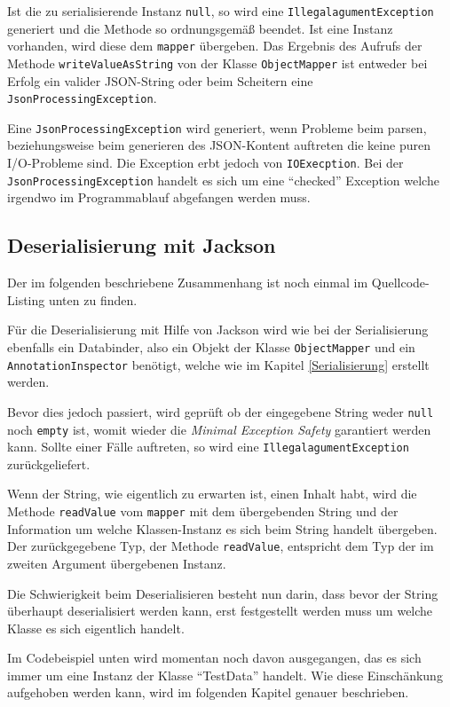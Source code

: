 Ist die zu serialisierende Instanz \texttt{null}, so wird eine \texttt{IllegalagumentException} generiert und die Methode so ordnungsgem\"a\ss{} beendet. Ist eine Instanz vorhanden, wird diese dem \texttt{mapper} \"ubergeben. Das Ergebnis des Aufrufs der Methode \texttt{writeValueAsString} von der Klasse \texttt{ObjectMapper} ist entweder bei Erfolg ein valider JSON-String oder beim Scheitern eine \\\texttt{JsonProcessingException}. 

Eine \texttt{JsonProcessingException} wird generiert, wenn Probleme beim parsen, beziehungsweise beim generieren des JSON-Kontent auftreten die keine puren I/O-Probleme sind. Die Exception erbt jedoch von \texttt{IOExecption}. Bei der \texttt{JsonProcessingException} handelt es sich um eine "`checked"' Exception welche irgendwo im Programmablauf abgefangen werden muss.


\newpage
\subsection{Deserialisierung mit Jackson}
Der im folgenden beschriebene Zusammenhang ist noch einmal im Quellcode-Listing unten zu finden.

F\"ur die Deserialisierung mit Hilfe von Jackson wird wie bei der Serialisierung ebenfalls ein Databinder, also ein Objekt der Klasse \texttt{ObjectMapper} und ein \texttt{AnnotationInspector} ben\"otigt, welche wie im Kapitel \ref{Serialisierung} erstellt werden. 

Bevor dies jedoch passiert, wird gepr\"uft ob der eingegebene String weder \texttt{null} noch \texttt{empty} ist, womit wieder die \textit{Minimal Exception Safety} garantiert werden kann. Sollte einer F\"alle auftreten, so wird eine \texttt{IllegalagumentException} zur\"uckgeliefert.

Wenn der String, wie eigentlich zu erwarten ist, einen Inhalt habt, wird die Methode \texttt{readValue} vom \texttt{mapper} mit dem \"ubergebenden String und der Information um welche Klassen-Instanz es sich beim String handelt \"ubergeben. Der zur\"uckgegebene Typ, der Methode \texttt{readValue}, entspricht dem Typ der im zweiten Argument \"ubergebenen Instanz.

Die Schwierigkeit beim Deserialisieren besteht nun darin, dass bevor der String \"uberhaupt deserialisiert werden kann, erst festgestellt werden muss um welche Klasse es sich eigentlich handelt.

Im Codebeispiel unten wird momentan noch davon ausgegangen, das es sich immer um eine Instanz der Klasse "`TestData"' handelt. Wie diese Einsch\"ankung aufgehoben werden kann, wird im folgenden Kapitel genauer beschrieben.


